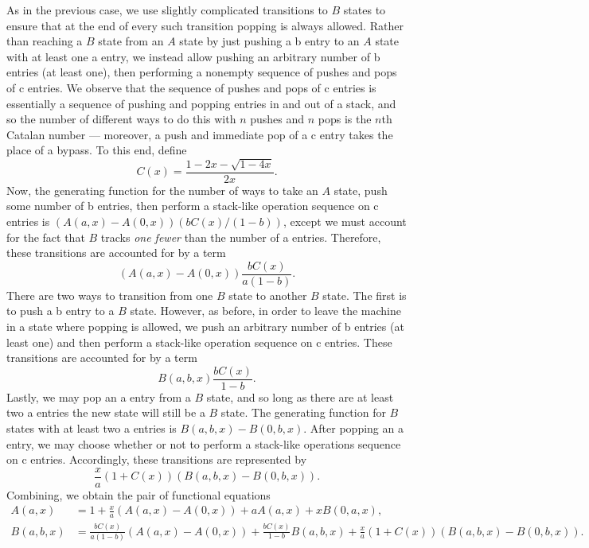 \documentclass[10pt]{article}
\theoremstyle{plain}
\theoremstyle{definition}
\begin{document}
As in the previous case, we use slightly complicated transitions to $B$ states to ensure that at the end of every such transition popping is always allowed. Rather than reaching a $B$ state from an $A$ state by just pushing a \textsf{b} entry to an $A$ state with at least one \textsf{a} entry, we instead allow pushing an arbitrary number of \textsf{b} entries (at least one), then performing a nonempty sequence of pushes and pops of \textsf{c} entries. We observe that the sequence of pushes and pops of \textsf{c} entries is essentially a sequence of pushing and popping entries in and out of a stack, and so the number of different ways to do this with $n$ pushes and $n$ pops is the $n$th Catalan number --- moreover, a push and immediate pop of a \textsf{c} entry takes the place of a bypass. To this end, define
\[
	C(x) = \frac{1-2x-\sqrt{1-4x}}{2x}.
\] 
Now, the generating function for the number of ways to take an $A$ state, push some number of \textsf{b} entries, then perform a stack-like operation sequence on \textsf{c} entries is $(A(a,x)-A(0,x))(bC(x)/(1-b))$, except we must account for the fact that $B$ tracks \emph{one fewer} than the number of \textsf{a} entries. Therefore, these transitions are accounted for by a term 
\[
	(A(a,x)-A(0,x))\frac{bC(x)}{a(1-b)}.
\]
There are two ways to transition from one $B$ state to another $B$ state. The first is to push a \textsf{b} entry to a $B$ state. However, as before, in order to leave the machine in a state where popping is allowed, we push an arbitrary number of \textsf{b} entries (at least one) and then perform a stack-like operation sequence on \textsf{c} entries. These transitions are accounted for by a term
\[
	B(a,b,x)\frac{bC(x)}{1-b}.
\]
Lastly, we may pop an \textsf{a} entry from a $B$ state, and so long as there are at least two \textsf{a} entries the new state will still be a $B$ state. The generating function for $B$ states with at least two \textsf{a} entries is $B(a,b,x) - B(0,b,x)$. After popping an \textsf{a} entry, we may choose whether or not to perform a stack-like operations sequence on \textsf{c} entries. Accordingly, these transitions are represented by 
\[
	\frac{x}{a}(1+C(x))(B(a,b,x) - B(0,b,x)).
\] 
Combining, we obtain the pair of functional equations
\begin{align*}
	A(a,x) &= 1 + \frac{x}{a}(A(a,x) - A(0,x)) + aA(a,x) + xB(0,a,x),\\
	B(a,b,x) &= \frac{bC(x)}{a(1-b)}(A(a,x) - A(0,x)) + \frac{bC(x)}{1-b}B(a,b,x) + \frac{x}{a}(1+C(x))(B(a,b,x) - B(0,b,x)).
\end{align*}
\end{document}
